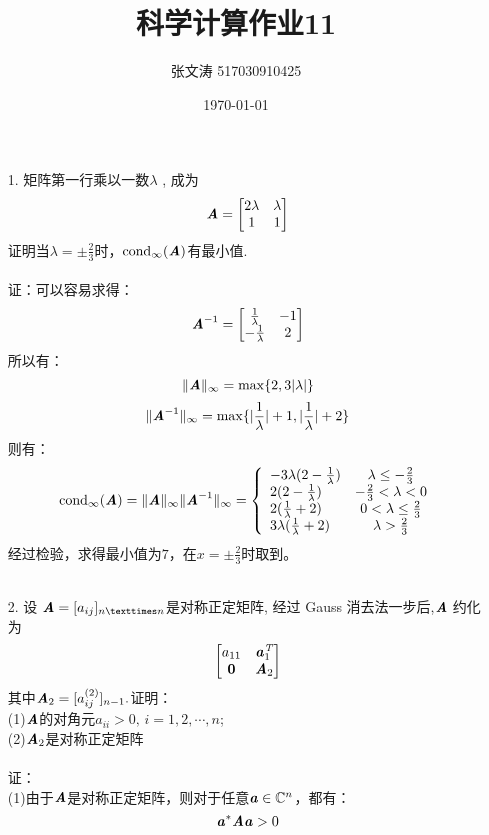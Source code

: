 \documentclass{article}
\title{科学计算作业11}
\author{张文涛 517030910425}
\date{\today}
\newcommand{\xc}[1]{\textbf{\emph{#1}}}
\newcommand{\infnorm}[1]{\|\textbf{\emph{#1}}\|_\infty}
\newcommand{\infnorminv}[1]{\|\textbf{\emph{#1}}^{-1}\|_\infty}
\newcommand{\condinf}{\mathrm{cond}_{\infty}}
\begin{document}
	\maketitle
	\begin{itemize}
		\item[1.]矩阵第一行乘以一数$\lambda$ , 成为
		$$
			\xc{A}=\begin{bmatrix}
			2\lambda & \lambda\\
			1&1
			\end{bmatrix}
		$$
		证明当$\lambda = \pm \frac{2}{3}$时，$\condinf(\xc{A})$有最小值.\\
		\\
		证：可以容易求得：
		$$	
			\xc{A}^{-1} = 	\begin{bmatrix}
			\frac{1}{\lambda} & -1\\
			-\frac{1}{\lambda} & 2
			\end{bmatrix}
		$$
		所以有：
		$$
			\infnorm{A} = \max\{2, 3|\lambda|\}
		$$
		$$
			\infnorminv{A} = \max\{|\frac{1}{\lambda}| + 1, |\frac{1}{\lambda}| + 2\}
		$$
		则有：
		$$
			\condinf(\xc{A}) = \infnorm{A}\infnorminv{A} =\left\{ \begin{array}{lcl}
			-3\lambda(2 - \frac{1}{\lambda}) & \lambda \le -\frac{2}{3}\\
			2(2 - \frac{1}{\lambda}) & -\frac{2}{3}< \lambda < 0\\
			2(\frac{1}{\lambda} + 2) & 0<\lambda\le\frac{2}{3}\\
			3\lambda(\frac{1}{\lambda} + 2) & \lambda > \frac{2}{3}
			\end{array}
			\right.
		$$
		经过检验，求得最小值为$7$，在$x = \pm \frac{2}{3}$时取到。\\
		\\
		\item[2.]设 $\xc{A} = [a_{ij}]_{n×n} $是对称正定矩阵, 经过 Gauss 消去法一步后,$\xc{A}$ 约化为
		$$
			\begin{bmatrix}
				a_{11} & \xc{a}_{1}^{\emph{T}}\\
				\textbf{0} & \xc{A}_2
			\end{bmatrix}
		$$
		其中$\xc{A}_2 = [a_{ij}^{(2)}]_{n-1}.$证明：\\
		(1)$\xc{A}$的对角元$a_{ii} > 0,\,i = 1,2,\cdots, n$;\\
		(2)$\xc{A}_2$是对称正定矩阵\\
		\\
		证：\\
		(1)由于$\xc{A}$是对称正定矩阵，则对于任意$\xc{a}\in\mathbb{C}^{n}$，都有：
		$$
			\xc{a}^{*}\xc{A}\xc{a} > 0
$$
\end{itemize}
\end{document}

